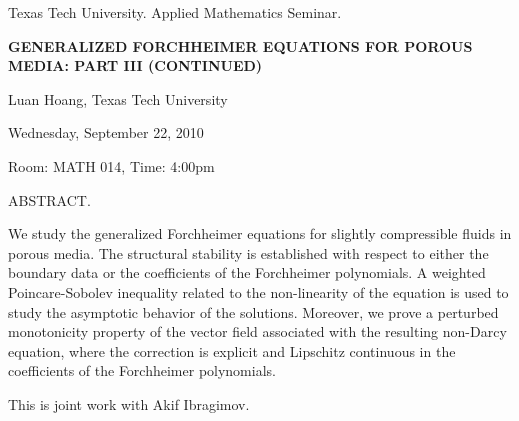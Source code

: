 \documentclass[oneside]{amsart}
\newcommand{\talktitle}{Generalized Forchheimer equations for porous
media: Part III (continued)}
\newcommand{\talkspeaker}{Luan Hoang, Texas Tech University}
\newcommand{\talkdate}{Wednesday, September 22, 2010}
\newcommand{\talkabstract}{
We study the generalized Forchheimer equations for slightly compressible fluids in porous media. The structural stability is established with respect to either the boundary data or the coefficients of the Forchheimer polynomials. A weighted Poincare-Sobolev inequality related to the non-linearity of the equation is used to study the asymptotic behavior of the solutions. Moreover, we prove a perturbed monotonicity property of the vector field associated with the resulting non-Darcy equation, where the correction is explicit and Lipschitz continuous in the coefficients of the Forchheimer polynomials.

This is joint work with Akif Ibragimov.
}
\begin{document}
\thispagestyle{empty}

\begin{center}
Texas Tech University.  Applied Mathematics Seminar.

\end{center}

\begin{center}

\textbf{\LARGE {\uppercase{\talktitle}} }

\talkspeaker

\talkdate

Room: MATH 014, Time: 4:00pm

\end{center}

ABSTRACT.
\talkabstract
\end{document}
